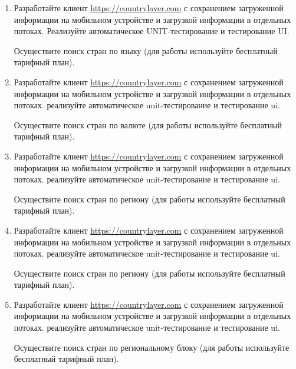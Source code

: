 \begin{enumerate}
	\item Разработайте клиент \url{https://countrylayer.com} с сохранением загруженной информации на мобильном устройстве и загрузкой
		информации в отдельных потоках. Реализуйте автоматическое UNIT-тестирование и тестирование UI.

		Осуществите поиск стран по языку (для работы используйте бесплатный тарифный план).

	\item Разработайте клиент \url{https://countrylayer.com} с сохранением загруженной информации на мобильном устройстве и загрузкой
		информации в отдельных потоках. реализуйте автоматическое unit-тестирование и тестирование ui.

		Осуществите поиск стран по валюте (для работы используйте бесплатный тарифный план).

	\item Разработайте клиент \url{https://countrylayer.com} с сохранением загруженной информации на мобильном устройстве и загрузкой
		информации в отдельных потоках. реализуйте автоматическое unit-тестирование и тестирование ui.

		Осуществите поиск стран по региону (для работы используйте бесплатный тарифный план).

	\item Разработайте клиент \url{https://countrylayer.com} с сохранением загруженной информации на мобильном устройстве и загрузкой
		информации в отдельных потоках. реализуйте автоматическое unit-тестирование и тестирование ui.

		Осуществите поиск стран по региону (для работы используйте бесплатный тарифный план).

	\item Разработайте клиент \url{https://countrylayer.com} с сохранением загруженной информации на мобильном устройстве и загрузкой
		информации в отдельных потоках. реализуйте автоматическое unit-тестирование и тестирование ui.

		Осуществите поиск стран по региональному блоку (для работы используйте бесплатный тарифный план).





\end{enumerate}
